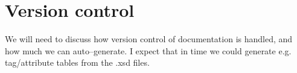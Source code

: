\section{Version control}

We will need to discuss how version control of documentation is handled, and how much we can auto--generate. I expect that in time we could generate e.g. tag/attribute tables from the .xsd files.  
